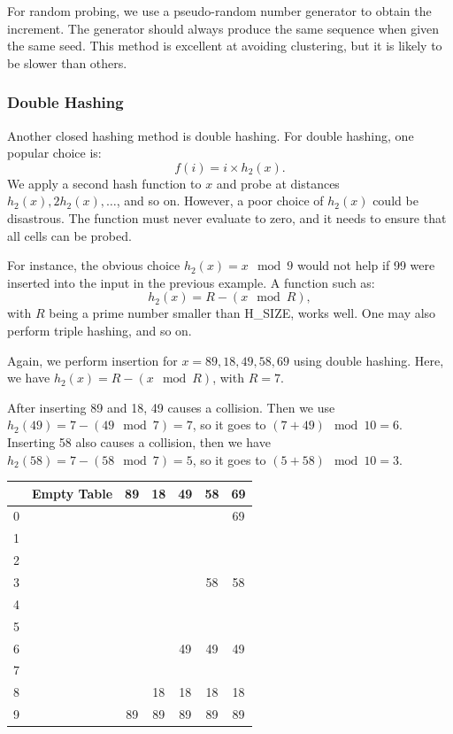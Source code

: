 For random probing, we use a pseudo-random number generator to obtain the increment. The generator should always produce the same sequence when given the same seed. This method is excellent at avoiding clustering, but it is likely to be slower than others.

\subsubsection{Double Hashing}
Another closed hashing method is double hashing. For double hashing, one popular choice is:
\[
f(i) = i \times h_2(x).
\]
We apply a second hash function to \(x\) and probe at distances \(h_2(x), 2h_2(x), \dots\), and so on. However, a poor choice of \(h_2(x)\) could be disastrous. The function must never evaluate to zero, and it needs to ensure that all cells can be probed.  

For instance, the obvious choice \(h_2(x) = x \mod 9\) would not help if 99 were inserted into the input in the previous example. A function such as:
\[
h_2(x) = R - (x \mod R),
\]
with \(R\) being a prime number smaller than H\_SIZE, works well. One may also perform triple hashing, and so on.

\begin{minipage}{0.5\textwidth}
Again, we perform insertion for \(x = 89, 18, 49, 58, 69\) using double hashing. Here, we have \(h_2(x) = R - (x \mod R)\), with \(R = 7\). 

After inserting 89 and 18, 49 causes a collision. Then we use \(h_2(49) = 7 - (49 \mod 7) = 7\), so it goes to \((7 + 49) \mod 10 = 6\). Inserting 58 also causes a collision, then we have \(h_2(58) = 7 - (58 \mod 7) = 5\), so it goes to \((5 + 58) \mod 10 = 3\). 
\end{minipage}
\begin{minipage}{0.5\textwidth}
\begin{table}[H]
  \centering
  \begin{tabular}{c|c|c|c|c|c|c}
      \toprule
        & Empty Table & 89 & 18 & 49 & 58 & 69  \\
    \midrule
      0 &  &  &  &  &  & 69  \\
      1 &  &  &  &  &  &   \\
      2 &  &  &  &  &  &   \\
      3 &  &  &  &  & 58 & 58  \\
      4 &  &  &  &  &  &   \\
      5 &  &  &  &  &  &   \\
      6 &  &  &  & 49 & 49 & 49  \\
      7 &  &  &  &  &  &   \\
      8 &  &  & 18 & 18 & 18 & 18  \\
      9 &  & 89 & 89 & 89 & 89 & 89  \\
      \bottomrule
  \end{tabular}
\end{table}
\end{minipage}

